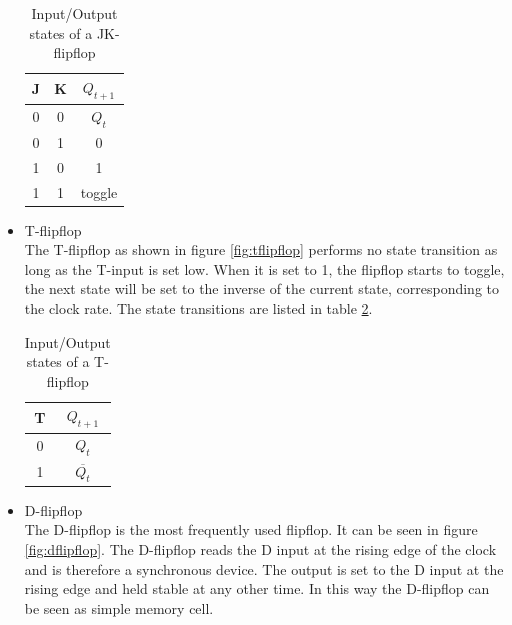 \begin{itemize}
\begin{table}
\begin{center}
\begin{tabular}{|c|c||c|}
\hline
J &  K & $Q_{t+1}$\\
\hline\hline
0 & 0 & $Q_{t}$\\
\hline
0 & 1 & 0\\
\hline
1 & 0 & 1\\
\hline
1 & 1 & toggle\\
\hline
\end{tabular}
\caption{Input/Output states of a JK-flipflop}
\label{tab:jkstates}
\end{center}
\end{table}

\item T-flipflop\\
The T-flipflop as shown in figure \ref{fig:tflipflop} performs no state transition as long as the T-input is set low. When it is set to 1, the flipflop starts to toggle, the next state will be set to the inverse of the current state, corresponding to the clock rate. The state transitions are listed in table \ref{tab:tstates}.
\begin{table}
\begin{center}
\begin{tabular}{|c||c|}
\hline
T & $Q_{t+1}$\\
\hline\hline
0  & $Q_{t}$\\
\hline
1  & $\overline{Q_{t}}$\\
\hline
\end{tabular}
\caption{Input/Output states of a T-flipflop}
\label{tab:tstates}
\end{center}
\end{table}

\item D-flipflop\\
The D-flipflop is the most frequently used flipflop. It can be seen in figure \ref{fig:dflipflop}. The D-flipflop reads the D input at the rising edge of the clock and is therefore a synchronous device. The output is set to the D input at the rising edge and held stable at any other time. In this way the D-flipflop can be seen as simple memory cell.

\end{itemize}

